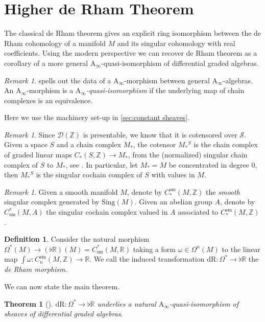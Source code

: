 \documentclass[10pt]{amsart}
\newcommand{\bA}{\mathrm{A}}
\newcommand{\D}{\mathscr{D}}
\newcommand{\s}{\mathscr{S}}
\newcommand{\bR}{\mathbb{R}}
\newcommand{\bZ}{\mathbb{Z}}
\newcommand{\Sing}{\mathrm{Sing}}
\newcommand{\dr}{\mathrm{dR}}
\newcommand{\sm}{\mathrm{sm}}
\newtheorem{theorem}[equation]{Theorem}
\theoremstyle{definition}
\newtheorem{definition}[equation]{Definition}
\theoremstyle{remark}
\newtheorem{remark}[equation]{Remark}
\numberwithin{equation}{section}
\begin{document}
\section{Higher de Rham Theorem}
The classical de Rham theorem gives an explicit ring isomorphism between the de Rham cohomology of a manifold $M$ and its singular cohomology with real coefficients. Using the modern perspective we can recover de Rham theorem as a corollary of a more general ${\bA}_\infty$-quasi-isomorphism of differential graded algebras. 
\begin{remark}
  \cite[Proposition 10.2.12]{loday2012algebraic} spells out the data of a $\bA_\infty$-morphism between general $\bA_\infty$-algebras. An $\bA_\infty$-morphism is a $\bA_\infty$\emph{-quasi-isomorphism} if the underlying map of chain complexes is an equivalence.  
\end{remark}
Here we use the machinery set-up in \cref{sec:constant sheaves}. 
\begin{remark}\label{rmk:Dcotensor}
  Since $\D(\bZ)$ is presentable, we know that it is cotensored over $\s$. Given a space $S$ and a chain complex $M_*$, the cotensor $M_*{}^S$ is the chain complex of graded linear maps $C_*(S,\bZ)\to M_*$, from the (normalized) singular chain complex of $S$ to $M_*$, see \cite[Definition 1.3.2.1]{lurie2017ha}. In particular, let $M_*=M$ be concentrated in degree 0, then $M_*{}^S$ is the singular cochain complex of $S$ with values in $M$. 
\end{remark}
\begin{remark}
  Given a smooth manifold $M$, denote by $C_*^\sm(M,\bZ)$ the \emph{smooth} singular complex generated by $\Sing(M)$. Given an abelian group $A$, denote by $C^*_\sm(M,A)$ the singular cochain complex valued in $A$ associated to $C_*^\sm(M,\bZ)$. 
\end{remark}
\begin{definition}\label{def:derhammorf}
Consider the natural morphism $\Omega^*(M)\to (\flat\bR)(M)=C_\sm^*(M,\bR)$ taking a form $\omega\in\Omega^n(M)$ to the linear map $\int\omega:C^\sm_{n}(M,\bZ)\to\bR$. We call the induced transformation $\dr:\Omega^*\to\flat\bR$ the \emph{de Rham morphism}.  
\end{definition}
We can now state the main theorem.  
\begin{theorem}[{\cite[Theorem 3.25]{abad2010ainftyrhamtheoremintegration}}]\label{thm:derham} 
  $\dr:\Omega^*\to\flat\bR$ underlies a natural $\bA_\infty$-quasi-isomorphism of sheaves of differential graded algebras. 
\end{theorem}
\end{document}
